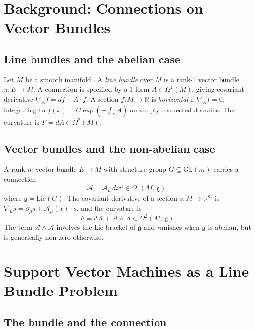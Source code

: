 \documentclass[11pt, a4paper]{article}
\theoremstyle{plain}
\theoremstyle{definition}
\newcommand{\R}{\mathbb{R}}
\newcommand{\GL}{\mathrm{GL}}
\newcommand{\Om}{\Omega}
\newcommand{\Sig}{\mathcal{A}}
\newcommand{\del}{\partial}
\begin{document}
\section{Background: Connections on Vector Bundles}

\subsection{Line bundles and the abelian case}

Let $M$ be a smooth manifold \cite{kobayashi1963}. A \emph{line bundle} over $M$ is a rank-1 vector
bundle $\pi\colon E \to M$. A connection is specified by a 1-form $A \in \Om^1(M)$,
giving covariant derivative $\nabla_A f = df + A \cdot f$. A section
$f\colon M \to \R$ is \emph{horizontal} if $\nabla_A f = 0$, integrating to
$f(x) = C\exp(-\int_\gamma A)$ on simply connected domains. The curvature is
$F = dA \in \Om^2(M)$.

\subsection{Vector bundles and the non-abelian case}

A rank-$m$ vector bundle $E \to M$ with structure group $G \subseteq \GL(m)$
carries a connection
\[
  \Sig = \Sig_\mu\,dx^\mu \in \Om^1(M,\,\mathfrak{g}),
\]
where $\mathfrak{g} = \mathrm{Lie}(G)$. The covariant derivative of a section
$s\colon M \to \R^m$ is $\nabla_\mu s = \del_\mu s + \Sig_\mu(x)\cdot s$, and
the curvature is
\[
  F = d\Sig + \Sig\wedge\Sig \in \Om^2(M,\,\mathfrak{g}).
\]
The term $\Sig\wedge\Sig$ involves the Lie bracket of $\mathfrak{g}$ and vanishes
when $\mathfrak{g}$ is abelian, but is generically non-zero otherwise.

\section{Support Vector Machines as a Line Bundle Problem}\label{sec:svm}

\subsection{The bundle and the connection}
\end{document}
